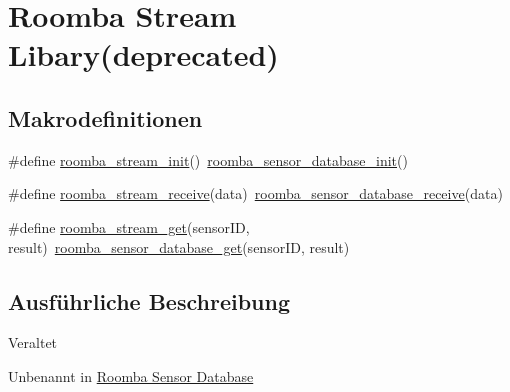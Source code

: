 \hypertarget{group__roomba__stream}{\section{Roomba Stream Libary(deprecated)}
\label{group__roomba__stream}
}
\subsection*{Makrodefinitionen}
\begin{DoxyCompactItemize}
\item 
\#define \hyperlink{group__roomba__stream_ga2d1d76a3d22844205c3f85874b64800a}{roomba\-\_\-stream\-\_\-init}()~\hyperlink{group__roomba__sensor__database_ga38f401da93f855f73927596759aa5a33}{roomba\-\_\-sensor\-\_\-database\-\_\-init}()
\item 
\#define \hyperlink{group__roomba__stream_ga6ec0b4dbf8cc52dcd6b7a579acce53f2}{roomba\-\_\-stream\-\_\-receive}(data)~\hyperlink{group__roomba__sensor__database_ga2ea066a1596a37271bead3cac5f74ab7}{roomba\-\_\-sensor\-\_\-database\-\_\-receive}(data)
\item 
\#define \hyperlink{group__roomba__stream_ga99af611ff197e680379795f5a22bc00d}{roomba\-\_\-stream\-\_\-get}(sensor\-I\-D, result)~\hyperlink{group__roomba__sensor__database_ga08fd92fbf686fe4b0ed2c8a0f47240f7}{roomba\-\_\-sensor\-\_\-database\-\_\-get}(sensor\-I\-D, result)
\end{DoxyCompactItemize}


\subsection{Ausführliche Beschreibung}
\begin{DoxyRefDesc}{Veraltet}
\item[\hyperlink{deprecated__deprecated000001}{Veraltet}]Unbenannt in \hyperlink{group__roomba__sensor__database}{Roomba Sensor Database}\end{DoxyRefDesc}


